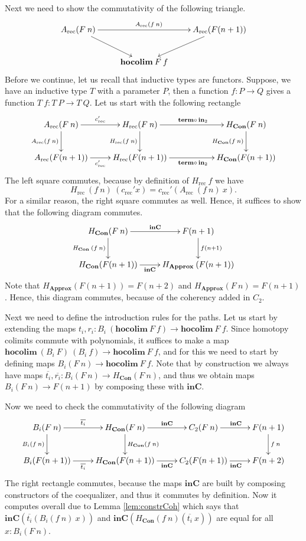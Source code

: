 \documentclass[a4paper,UKenglish]{lipics-v2016}
\newcommand{\Boperator}[1]{\mathrm{\mathbf{#1}}}
\newcommand{\inn}{\Boperator{in}}
\newcommand{\comp}[0]{\circ \,}
\newcommand{\rec}[0]{\operatorname{rec}}
\newcommand{\term}[0]{\textbf{term}}
\newcommand{\Con}[0]{\textbf{Con}}
\newcommand{\Approx}[0]{\textbf{Approx}}
\newcommand{\inC}[0]{\Boperator{inC}}
\newcommand{\hocolim}[0]{\Boperator{hocolim}}
\begin{document}
Next we need to show the commutativity of the following triangle.
\[
\xymatrix
{
        A_{\rec}(F \> n) \ar[rr]^{A_{\rec}(f \> n)} \ar[dr] & & A_{\rec}(F(n+1)) \ar[dl] \\
        & \hocolim \> F \> f &
}
\]
Before we continue, let us recall that inductive types are functors.
Suppose, we have an inductive type $T$ with a parameter $P$, then a function $f : P \rightarrow Q$ gives a function $T \> f : T \> P \rightarrow T \> Q$.
Let us start with the following rectangle
\[
\xymatrix
{
        A_{\rec}(F \> n) \ar[r]^-{c_{\rec}'} \ar[d]_{A_{\rec}(f \> n)} 
                & H_{\rec}(F \> n) \ar[rr]^{\term \comp \inn_2} \ar[d]_{H_{\rec}(f \> n)} &
                & H_{\Con}(F \> n) \ar[d]_{H_{\Con}(f \> n)}\\
        A_{\rec}(F(n+1)) \ar[r]_-{c_{\rec}'} 
                & H_{\rec}(F(n+1)) \ar[rr]_{\term \comp \inn_2} &
                & H_{\Con}(F(n+1))
}
\]
The left square commutes, because by definition of $H_{\rec} \> f$ we have
\[
H_{\rec} \>(f \> n) \> (c_{\rec}' x) = c_{\rec}' (A_{\rec} \> (f \> n) \> x).
\]
For a similar reason, the right square commutes as well.
Hence, it suffices to show that the following diagram commutes.
\[
\xymatrix
{
        H_{\Con}(F \> n) \ar[d]_{H_{\Con} \> (f \> n)} \ar[r]^-{\inC}
                & F(n+1) \ar[d]^{f(n+1)}\\
        H_{\Con}(F(n+1)) \ar[r]_-{\inC}
                & H_{\Approx} \> (F(n+1))
}
\]
Note that $H_{\Approx}(F(n+1)) = F(n+2)$ and $H_{\Approx}(F \> n) = F(n+1)$.
Hence, this diagram commutes, because of the coherency added in $C_2$.

Next we need to define the introduction rules for the paths.
Let us start by extending the maps $t_i, r_i : B_i \> (\hocolim \> F \> f) \rightarrow \hocolim \> F \> f$.
Since homotopy colimits commute with polynomials, it suffices to make a map $\hocolim \> (B_i \> F) \> (B_i \> f)  \rightarrow \hocolim \> F \> f$, and for this we need to start by defining maps $B_i(F \> n) \rightarrow \hocolim \> F \> f$.
Note that by construction we always have maps $\overline{t_i}, \overline{r_i} : B_i(F \> n) \rightarrow H_{\Con}(F \> n)$, and thus we obtain maps $B_i(F \> n) \rightarrow F(n+1)$ by composing these with $\inC$.

Now we need to check the commutativity of the following diagram
\[
\xymatrix
{
        B_i(F \> n) 
        \ar[r]^-{\overline{t_i}} 
        \ar[d]_{B_i(f \> n)} 
        & 
        H_{\Con}(F \> n) 
        \ar[r]^-{\inC}
        \ar[d]^{H_{\Con}(f \> n)}  
        & 
        C_2(F \> n)
        \ar[r]^{\inC}
        & 
        F(n+1) 
        \ar[d]^{f \> n}\\
        B_i(F(n+1)) 
        \ar[r]_-{\overline{t_i}} 
        & 
        H_{\Con}(F(n+1)) 
        \ar[r]_-{\inC} 
        & 
        C_2(F(n+1))
        \ar[r]_{\inC} 
        & 
        F(n+2)
}
\]
The right rectangle commutes, because the maps $\inC$ are built by composing constructors of the coequalizer, and thus it commutes by definition.
Now it computes overall due to Lemma \ref{lem:constrCoh} which says that $\inC(\overline{t_i}(B_i(f \> n) \> x))$ and $\inC(H_{\Con}(f \> n)(\overline{t_i} \> x))$ are equal for all $x : B_i(F \> n)$.
\end{document}
